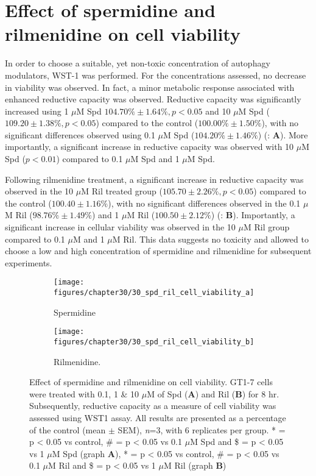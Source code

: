 {\section{Effect of spermidine and rilmenidine on cell viability}
In order to choose a suitable, yet non-toxic concentration of autophagy modulators, WST-1 was performed. For the concentrations assessed, no decrease in viability was observed. In fact, a minor metabolic response associated with enhanced reductive capacity was observed. Reductive capacity was significantly increased using 1 $\mu$M Spd $104.70\% \pm 1.64\%, p < 0.05$ and 10 $\mu$M Spd ($109.20 \pm 1.38\%, p < 0.05$) compared to the control ($100.00\% \pm 1.50\%$), with no significant differences observed using 0.1 $\mu$M Spd ($104.20\% \pm 1.46\%$) (: \textbf{A}). More importantly, a significant increase in reductive capacity was observed with 10 $\mu$M Spd ($p < 0.01$) compared to 0.1 $\mu$M Spd and 1 $\mu$M Spd.

Following rilmenidine treatment, a significant increase in reductive capacity was observed in the 10 $\mu$M Ril treated group ($105.70 \pm 2.26\%, p < 0.05$) compared to the control ($100.40 \pm 1.16\%$), with no significant differences observed in the 0.1 $\mu$M Ril ($98.76\% \pm 1.49\%$) and 1 $\mu$M Ril ($100.50 \pm 2.12\%$) (: \textbf{B}). Importantly, a significant increase in cellular viability was observed in the 10 $\mu$M Ril group compared to 0.1 $\mu$M and 1 $\mu$M Ril. This data suggests no toxicity and allowed to choose a low and high concentration of spermidine and rilmenidine for subsequent experiments.

\begin{figure}[!htbp]
  \centering
  \begin{subfigure}[b]{0.48\linewidth}
    \texttt{[image: figures/chapter30/30\_spd\_ril\_cell\_viability\_a]}
    \caption{Spermidine}
  \end{subfigure}
  \begin{subfigure}[b]{0.48\linewidth}
    \texttt{[image: figures/chapter30/30\_spd\_ril\_cell\_viability\_b]}
    \caption{Rilmenidine.}
  \end{subfigure}
  \caption[Effect of spermidine and rilmenidine on cell viability]{Effect of spermidine and rilmenidine on cell viability. GT1-7 cells were treated with 0.1, 1 \& 10 $\mu$M of Spd (\textbf{A}) and Ril (\textbf{B}) for 8 hr. Subsequently, reductive capacity as a measure of cell viability was assessed using WST1 assay. All results are presented as a percentage of the control (mean $\pm$ SEM), \textit{n}=3, with 6 replicates per group. * = p < 0.05 vs control, \# = p < 0.05 vs 0.1 $\mu$M Spd and \$ = p < 0.05 vs 1 $\mu$M Spd (graph \textbf{A}), * = p < 0.05 vs control, \# = p < 0.05 vs 0.1 $\mu$M Ril and \$ = p < 0.05 vs 1 $\mu$M Ril (graph \textbf{B})}
  \label{fig:30_spd_cell_viability}
\end{figure}

}
